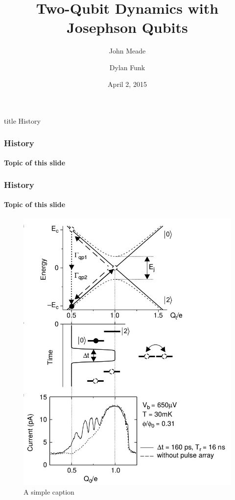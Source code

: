 \documentclass{beamer}
\title{Two-Qubit Dynamics with Josephson Qubits}
\author{John Meade \and Dylan Funk}
\date{April 2, 2015}
\begin{document}
\begin{frame}
\titlepage
\end{frame}


\begin{frame}
    \vfill
    \centering
    \begin{beamercolorbox}[sep=8pt,center,shadow=true,rounded=true]{title}
        History
    \end{beamercolorbox}
    \vfill
\end{frame}


\begin{frame}
    \frametitle{History}
    \framesubtitle{Topic of this slide}
\end{frame}


\begin{frame}
    \frametitle{History}
    \framesubtitle{Topic of this slide}
\end{frame}


\begin{frame}
    \begin{figure}[ht!]
        \centering
        \includegraphics[height=0.8\textheight]{img/single-qubit-band-diagram.jpg}
        \caption{A simple caption}
    \end{figure}
\end{frame}
\end{document}
